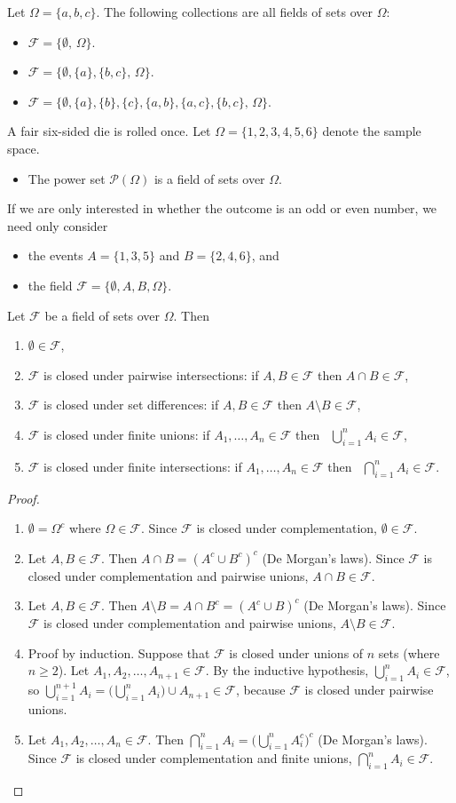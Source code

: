 \documentclass[lecture]{csm}
\def\it{\item}
\def\bit{\begin{itemize}}
\def\eit{\end{itemize}}
\def\ben{\begin{enumerate}}
\def\een{\end{enumerate}}
\begin{document}
\begin{example}
Let $\Omega=\{a,b,c\}$. The following collections are all fields of sets over $\Omega$:
\begin{hidebox}
\bit
\it $\mathcal{F} = \{\emptyset,\,\Omega\}$.
\it $\mathcal{F} = \big\{\emptyset,\{a\},\{b,c\},\,\Omega\big\}$.
\it $\mathcal{F} = \big\{\emptyset,\{a\},\{b\},\{c\},\{a,b\},\{a,c\},\{b,c\},\,\Omega\big\}$.
\eit
\end{hidebox}
\end{example}

\begin{example}\label{ex:sigma_fields}
A fair six-sided die is rolled once. Let $\Omega=\{1,2,3,4,5,6\}$ denote the sample space.
\bit
\it The power set $\mathcal{P}(\Omega)$ is a field of sets over $\Omega$.
\eit
\vspace*{2ex}
If we are only interested in whether the outcome is an odd or even number, we need only consider 
\bit
\it the events $A=\{1,3,5\}$ and $B=\{2,4,6\}$, and
\it the field ${\mathcal{F}} = \{\emptyset, A, B, \Omega\}$.
\eit
\end{example}

\begin{theorem}\label{prop:properties_of_fields}
Let $\mathcal{F}$ be a field of sets over $\Omega$. Then
\ben
\it $\emptyset\in\mathcal{F}$,
\it $\mathcal{F}$ is closed under pairwise intersections: if $A,B\in\mathcal{F}$ then $A\cap B\in\mathcal{F}$,
\it $\mathcal{F}$ is closed under set differences: if $A,B\in\mathcal{F}$ then $A\setminus B\in\mathcal{F}$,
\it $\mathcal{F}$ is closed under finite unions: if $A_1,\ldots,A_n\in\mathcal{F}$ then \ $\bigcup_{i=1}^{n}A_i\in\mathcal{F}$, 
\it $\mathcal{F}$ is closed under finite intersections: if $A_1,\ldots,A_n\in\mathcal{F}$ then \ $\bigcap_{i=1}^{n}A_i\in\mathcal{F}$.
\een
\end{theorem}

\newpage

\begin{proof}
\ben
\it 
$\emptyset = \Omega^c$ where $\Omega\in\mathcal{F}$. Since $\mathcal{F}$ is closed under complementation, $\emptyset\in\mathcal{F}$.
\it
Let $A,B\in\mathcal{F}$. Then $A\cap B = (A^c\cup B^c)^c$ (De Morgan's laws). Since $\mathcal{F}$ is closed under complementation and pairwise unions, $A\cap B\in\mathcal{F}$.
\it
Let $A,B\in\mathcal{F}$. Then $A\setminus B = A\cap B^c = (A^c\cup B)^c$ (De Morgan's laws). Since $\mathcal{F}$ is closed under complementation and pairwise unions, $A\setminus B\in\mathcal{F}$.
\it
Proof by induction. Suppose that $\mathcal{F}$ is closed under unions of $n$ sets (where $n\geq 2$). Let $A_1,A_2,\ldots,A_{n+1}\in\mathcal{F}$. By the inductive hypothesis, $\bigcup_{i=1}^nA_i\in\mathcal{F}$, so $\bigcup_{i=1}^{n+1} A_i = \big(\bigcup_{i=1}^{n} A_i\big) \cup A_{n+1} \in\mathcal{F}$, because $\mathcal{F}$ is closed under pairwise unions.
\it
Let $A_1,A_2,\ldots,A_n\in\mathcal{F}$. Then $\bigcap_{i=1}^n A_i = \big(\bigcup_{i=1}^n A_i^c\big)^c$ (De Morgan's laws). Since $\mathcal{F}$ is closed under complementation and finite unions, $\bigcap_{i=1}^n A_i\in\mathcal{F}$.
\een
\end{proof}
\end{document}
